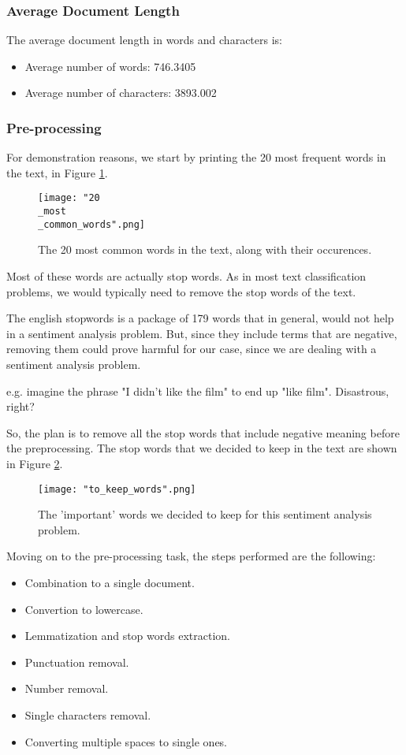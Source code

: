 \documentclass[10pt, a4paper]{article}
\begin{document}
	
	\subsubsection{Average Document Length }
	
	The average document length in words and characters is:
	\begin{itemize}
		\item Average number of words: 746.3405
		\item Average number of characters: 3893.002
	\end{itemize}


	\subsubsection{Pre-processing}
	
	For demonstration reasons, we start by printing the 20 most frequent words in the text, in Figure \ref{fig::20_common}.
	
	\begin{figure}
		\centering
		\texttt{[image: "20\\\_most\\\_common\_words".png]}
		\caption{The 20 most common words in the text, along with their occurences.}
		\label{fig::20_common}
	\end{figure}
	
	
	
	Most of these words are actually stop words. As in most text classification problems, we would typically need to remove the stop words of the text.
	
	The english stopwords is a package of 179 words that in general, would not help in a sentiment analysis problem. But, since they include terms that are negative, removing them could prove harmful for our case, since we are dealing with a sentiment analysis problem.
	
	e.g. imagine the phrase "I didn't like the film" to end up "like film". Disastrous, right?
	
	So, the plan is to remove all the stop words that include negative meaning before the preprocessing.
	The stop words that we decided to keep in the text are shown in Figure \ref{fig::to_keep}.
	
	\begin{figure}
		\centering
		\texttt{[image: "to\_keep\_words".png]}
		\caption{The 'important' words we decided to keep for this sentiment analysis problem.}
		\label{fig::to_keep}
	\end{figure}
	
	Moving on to the pre-processing task, the steps performed are the following:
	\begin{itemize}
		\item{ Combination to a single document.}
		\item{ Convertion to lowercase.}
		\item{Lemmatization and stop words extraction.}
		\item{ Punctuation removal.}
		\item{ Number removal.}
		\item{Single characters removal.}
		\item{ Converting multiple spaces to single ones.}
	\end{itemize}
 
\end{document}
